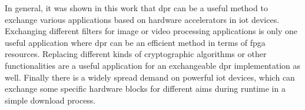 In general, it was shown in this work that \gls{dpr} can be a useful method to
exchange various applications based on hardware accelerators in \gls{iot}
devices. 
Exchanging different filters for image or video processing applications is only
one useful application where \gls{dpr} can be an efficient method in terms of
\gls{fpga} resources.
Replacing different kinds of cryptographic algorithms or other functionalities
are a useful application for an exchangeable \gls{dpr} implementation as well.
Finally there is a widely spread demand on powerful \gls{iot} devices, which
can exchange some specific hardware blocks for different aims during
runtime in a simple download process.

